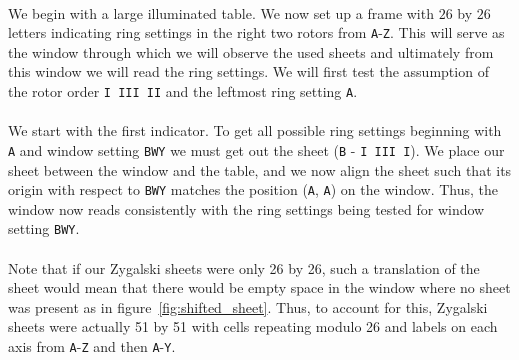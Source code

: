 \\We begin with a large illuminated table. We now set up a frame with
$26$ by $26$ letters indicating ring settings in the right two rotors
from \texttt{A}-\texttt{Z}. This will serve as the window through
which we will observe the used sheets and ultimately from this window
we will read the ring settings. We will first test the assumption of
the rotor order \texttt{I III II} and the leftmost ring setting \texttt{A}.
\\\\We start with the first indicator. To get all possible ring
settings beginning with \texttt{A} and window setting \texttt{BWY} we
must get out the sheet (\texttt{B} - \texttt{I III I}). We place our
sheet between the window and the table, and we now align the sheet
such that its origin with respect to \texttt{BWY} matches the
position (\texttt{A}, \texttt{A}) on the window. Thus, the window now
reads consistently with the ring settings being tested for window
setting \texttt{BWY}.
\\\\Note that if our Zygalski sheets were only 26 by 26, such a
translation of the sheet would mean that there would be empty space
in the window where no sheet was present as in
figure~\ref{fig:shifted_sheet}. Thus, to account for this, Zygalski
sheets were actually 51 by 51 with cells repeating modulo 26 and
labels on each axis from \texttt{A}-\texttt{Z} and then \texttt{A}-\texttt{Y}.
